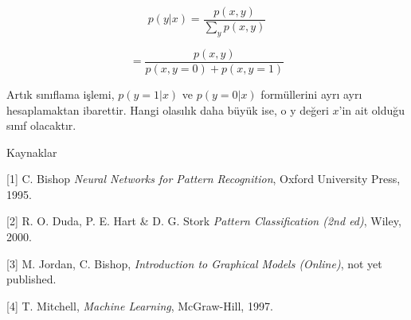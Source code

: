 \documentclass[12pt,fleqn]{article}\usepackage{../../common}
\begin{document}
$$ 
p(y|x) = \frac{p(x,y)}{\sum_{y}p(x,y)}  
$$

$$   
= \frac{p(x,y)}{p(x,y=0) + p(x,y=1)}
$$ 

Artık sınıflama işlemi, $p(y=1|x)$ ve $p(y=0|x)$ formüllerini ayrı ayrı
hesaplamaktan ibarettir. Hangi olasılık daha büyük ise, o y değeri $x$'in
ait olduğu sınıf olacaktır.

Kaynaklar
  
[1] C. Bishop {\em Neural Networks for Pattern Recognition}, Oxford University Press, 1995.

[2] R. O. Duda, P. E. Hart \& D. G. Stork {\em Pattern Classification (2nd ed)}, Wiley, 2000.

[3] M. Jordan, C. Bishop, {\em Introduction to  Graphical Models (Online)}, not yet published.

[4] T. Mitchell, {\em Machine Learning}, McGraw-Hill, 1997.
\end{document}
